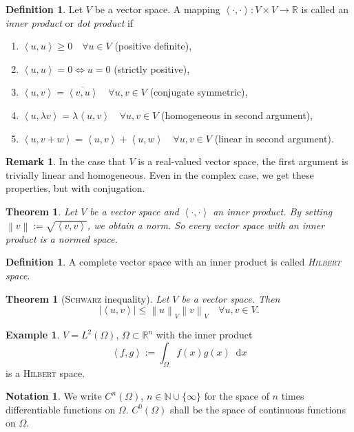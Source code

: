 \documentclass[12pt,a4paper,twoside, open=right]{scrreprt}
\theoremstyle{definition}
\newtheorem{rem}[auf]{Remark}
\newtheorem{defn}[auf]{Definition}
\newtheorem{bsp}[auf]{Example}
\newtheorem{notation}[auf]{Notation}
\theoremstyle{plain}
\newtheorem{sa}[auf]{Theorem}
\newcommand{\abs}[1]{\left\vert #1\right\vert}
\newcommand{\dotp}[2]{\left\langle #1,#2\right\rangle}
\newcommand{\rr}{\mathbb{R}}
\newcommand{\nn}{\mathbb{N}}
\newcommand{\norm}[1]{\left\lVert#1\right\rVert}
\newcommand{\D}{\mathop{}\!\mathrm{d}}
\begin{document}
\begin{defn}
    Let $V$ be a vector space. A mapping $\dotp{\cdot}{\cdot}\colon V\times V\to\rr$ is called an \emph{inner product} or \emph{dot product} if 
    \begin{enumerate}
        \item $\dotp{u}{u} \ge 0 \quad \forall u\in V$ (positive definite),
        \item $\dotp{u}{u} = 0 \Leftrightarrow u=0 $  (strictly positive),
        \item $\dotp{u}{v} = \overline{\dotp{v}{u}}   \quad\forall u,v\in V$ (conjugate symmetric),
        \item $\dotp{u}{\lambda v} = \lambda\dotp{u}{v} \quad\forall u,v\in V$ (homogeneous in second argument),
        \item $\dotp{u}{v+w} =\dotp{u}{v}+\dotp{u}{w} \quad\forall u,v\in V$ (linear in second argument).
    \end{enumerate}
\end{defn}
\begin{rem}
    In the case that $V$ is a real-valued vector space, the first argument is trivially linear and homogeneous. Even in the complex case, we get these properties, but with conjugation.
\end{rem}
\begin{sa}
    Let $V$ be a vector space and $\dotp{\cdot}{\cdot}$ an inner product. By setting $\norm{v}:=\sqrt{\dotp{v}{v}}$, we obtain a norm. So every vector space with an inner product is a normed space.
\end{sa}
\begin{defn}
    A complete vector space with an inner product is called \emph{\textsc{Hilbert} space}.
\end{defn}
\begin{sa}[\textsc{Schwarz} inequality]
    Let $V$ be a vector space. Then 
    \begin{equation}
        \abs{\dotp{u}{v}}\le\norm{u}_V\norm{v}_V\quad \forall u,v\in V.
    \end{equation}
\end{sa}
\begin{bsp}
    $V=L^2(\Omega)$, $\Omega\subset\rr^n$ with the inner product
    \begin{equation}
       \dotp{f}{g}:=\int_\Omega f(x)g(x)\D x
    \end{equation}
    is a \textsc{Hilbert} space.
\end{bsp}
\begin{notation}
    We write $C^n(\Omega)$, $n\in\nn\cup\{\infty\}$ for the space of $n$ times differentiable functions on $\Omega$. $C^0(\Omega)$ shall be the space of continuous functions on $\Omega$.
\end{notation}
\end{document}
